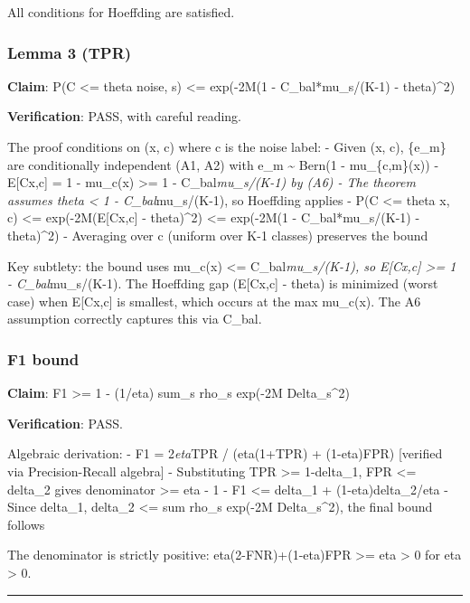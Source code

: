 \documentclass[
  12pt,
]{article}
\begin{document}
All conditions for Hoeffding are satisfied.

\subsubsection{Lemma 3 (TPR)}\label{lemma-3-tpr}

\textbf{Claim}: P(C \textless= theta \textbar{} noise, s) \textless=
exp(-2M(1 - C\_bal*mu\_s/(K-1) - theta)\^{}2)

\textbf{Verification}: PASS, with careful reading.

The proof conditions on (x, c) where c is the noise label: - Given (x,
c), \{e\_m\} are conditionally independent (A1, A2) with e\_m
\textasciitilde{} Bern(1 - mu\_\{c,m\}(x)) - E{[}C\textbar x,c{]} = 1 -
mu\_c(x) \textgreater= 1 - C\_bal\emph{mu\_s/(K-1) by (A6) - The theorem
assumes theta \textless{} 1 - C\_bal}mu\_s/(K-1), so Hoeffding applies -
P(C \textless= theta \textbar{} x, c) \textless=
exp(-2M(E{[}C\textbar x,c{]} - theta)\^{}2) \textless= exp(-2M(1 -
C\_bal*mu\_s/(K-1) - theta)\^{}2) - Averaging over c (uniform over K-1
classes) preserves the bound

Key subtlety: the bound uses mu\_c(x) \textless=
C\_bal\emph{mu\_s/(K-1), so E{[}C\textbar x,c{]} \textgreater= 1 -
C\_bal}mu\_s/(K-1). The Hoeffding gap (E{[}C\textbar x,c{]} - theta) is
minimized (worst case) when E{[}C\textbar x,c{]} is smallest, which
occurs at the max mu\_c(x). The A6 assumption correctly captures this
via C\_bal.

\subsubsection{F1 bound}\label{f1-bound}

\textbf{Claim}: F1 \textgreater= 1 - (1/eta) sum\_s rho\_s exp(-2M
Delta\_s\^{}2)

\textbf{Verification}: PASS.

Algebraic derivation: - F1 = 2\emph{eta}TPR / (eta(1+TPR) + (1-eta)FPR)
{[}verified via Precision-Recall algebra{]} - Substituting TPR
\textgreater= 1-delta\_1, FPR \textless= delta\_2 gives denominator
\textgreater= eta - 1 - F1 \textless= delta\_1 + (1-eta)delta\_2/eta -
Since delta\_1, delta\_2 \textless= sum rho\_s exp(-2M Delta\_s\^{}2),
the final bound follows

The denominator is strictly positive: eta(2-FNR)+(1-eta)FPR
\textgreater= eta \textgreater{} 0 for eta \textgreater{} 0.

\begin{center}\rule{0.5\linewidth}{0.5pt}\end{center}
\end{document}
